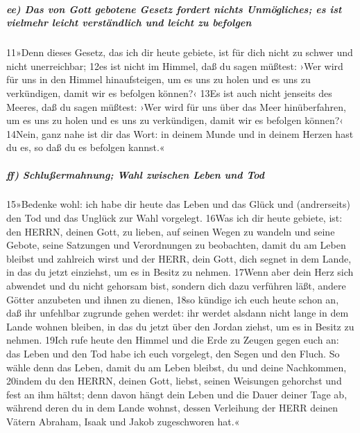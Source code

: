 \hypertarget{ee-das-von-gott-gebotene-gesetz-fordert-nichts-unmuxf6gliches-es-ist-vielmehr-leicht-verstuxe4ndlich-und-leicht-zu-befolgen}{%
\subparagraph{ee) Das von Gott gebotene Gesetz fordert nichts
Unmögliches; es ist vielmehr leicht verständlich und leicht zu
befolgen}\label{ee-das-von-gott-gebotene-gesetz-fordert-nichts-unmuxf6gliches-es-ist-vielmehr-leicht-verstuxe4ndlich-und-leicht-zu-befolgen}}

11»Denn dieses Gesetz, das ich dir heute gebiete, ist für dich nicht zu
schwer und nicht unerreichbar; 12es ist nicht im Himmel, daß du sagen
müßtest: ›Wer wird für uns in den Himmel hinaufsteigen, um es uns zu
holen und es uns zu verkündigen, damit wir es befolgen können?‹ 13Es ist
auch nicht jenseits des Meeres, daß du sagen müßtest: ›Wer wird für uns
über das Meer hinüberfahren, um es uns zu holen und es uns zu
verkündigen, damit wir es befolgen können?‹ 14Nein, ganz nahe ist dir
das Wort: in deinem Munde und in deinem Herzen hast du es, so daß du es
befolgen kannst.«

\hypertarget{ff-schluuxdfermahnung-wahl-zwischen-leben-und-tod}{%
\subparagraph{ff) Schlußermahnung; Wahl zwischen Leben und
Tod}\label{ff-schluuxdfermahnung-wahl-zwischen-leben-und-tod}}

15»Bedenke wohl: ich habe dir heute das Leben und das Glück und
(andrerseits) den Tod und das Unglück zur Wahl vorgelegt. 16Was ich dir
heute gebiete, ist: den HERRN, deinen Gott, zu lieben, auf seinen Wegen
zu wandeln und seine Gebote, seine Satzungen und Verordnungen zu
beobachten, damit du am Leben bleibst und zahlreich wirst und der HERR,
dein Gott, dich segnet in dem Lande, in das du jetzt einziehst, um es in
Besitz zu nehmen. 17Wenn aber dein Herz sich abwendet und du nicht
gehorsam bist, sondern dich dazu verführen läßt, andere Götter anzubeten
und ihnen zu dienen, 18so kündige ich euch heute schon an, daß ihr
unfehlbar zugrunde gehen werdet: ihr werdet alsdann nicht lange in dem
Lande wohnen bleiben, in das du jetzt über den Jordan ziehst, um es in
Besitz zu nehmen. 19Ich rufe heute den Himmel und die Erde zu Zeugen
gegen euch an: das Leben und den Tod habe ich euch vorgelegt, den Segen
und den Fluch. So wähle denn das Leben, damit du am Leben bleibst, du
und deine Nachkommen, 20indem du den HERRN, deinen Gott, liebst, seinen
Weisungen gehorchst und fest an ihm hältst; denn davon hängt dein Leben
und die Dauer deiner Tage ab, während deren du in dem Lande wohnst,
dessen Verleihung der HERR deinen Vätern Abraham, Isaak und Jakob
zugeschworen hat.«

